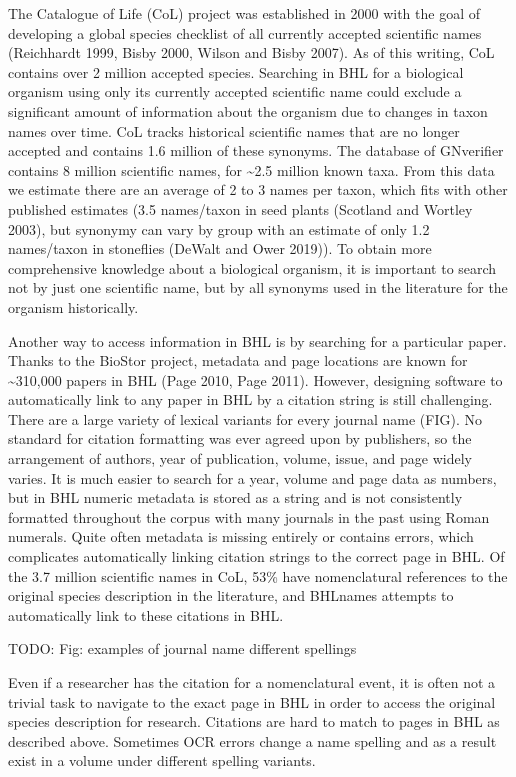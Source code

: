 \documentclass[
]{article}
\begin{document}
The Catalogue of Life (CoL) project was established in 2000 with the
goal of developing a global species checklist of all currently accepted
scientific names (Reichhardt 1999, Bisby 2000, Wilson and Bisby 2007).
As of this writing, CoL contains over 2 million accepted species.
Searching in BHL for a biological organism using only its currently
accepted scientific name could exclude a significant amount of
information about the organism due to changes in taxon names over time.
CoL tracks historical scientific names that are no longer accepted and
contains 1.6 million of these synonyms. The database of GNverifier
contains 8 million scientific names, for \textasciitilde2.5 million
known taxa. From this data we estimate there are an average of 2 to 3
names per taxon, which fits with other published estimates (3.5
names/taxon in seed plants (Scotland and Wortley 2003), but synonymy can
vary by group with an estimate of only 1.2 names/taxon in stoneflies
(DeWalt and Ower 2019)). To obtain more comprehensive knowledge about a
biological organism, it is important to search not by just one
scientific name, but by all synonyms used in the literature for the
organism historically.

Another way to access information in BHL is by searching for a
particular paper. Thanks to the BioStor project, metadata and page
locations are known for \textasciitilde310,000 papers in BHL (Page 2010,
Page 2011). However, designing software to automatically link to any
paper in BHL by a citation string is still challenging. There are a
large variety of lexical variants for every journal name (FIG). No
standard for citation formatting was ever agreed upon by publishers, so
the arrangement of authors, year of publication, volume, issue, and page
widely varies. It is much easier to search for a year, volume and page
data as numbers, but in BHL numeric metadata is stored as a string and
is not consistently formatted throughout the corpus with many journals
in the past using Roman numerals. Quite often metadata is missing
entirely or contains errors, which complicates automatically linking
citation strings to the correct page in BHL. Of the 3.7 million
scientific names in CoL, 53\% have nomenclatural references to the
original species description in the literature, and BHLnames attempts to
automatically link to these citations in BHL.

TODO: Fig: examples of journal name different spellings

Even if a researcher has the citation for a nomenclatural event, it is
often not a trivial task to navigate to the exact page in BHL in order
to access the original species description for research. Citations are
hard to match to pages in BHL as described above. Sometimes OCR errors
change a name spelling and as a result exist in a volume under different
spelling variants.
\end{document}
